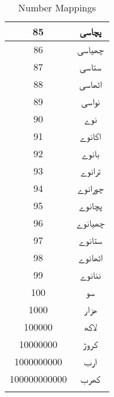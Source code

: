 \begin{longtable}[c]{|c|c|}
85              & \texturdu{پچاسی}   \\ \hline
86              & \texturdu{چھیاسی}   \\ \hline
87              & \texturdu{ستاسی}    \\ \hline
88              & \texturdu{اٹھاسی}   \\ \hline
89              & \texturdu{نواسی}    \\ \hline
90              & \texturdu{نوے}      \\ \hline
91              & \texturdu{اکانوے}   \\ \hline
92              & \texturdu{بانوے}    \\ \hline
93              & \texturdu{ترانوے}   \\ \hline
94              & \texturdu{چورانوے}  \\ \hline
95              & \texturdu{پچانوے}   \\ \hline
96              & \texturdu{چھیانوے}  \\ \hline
97              & \texturdu{ستانوے}   \\ \hline
98              & \texturdu{اٹھانوے}  \\ \hline
99              & \texturdu{ننانوے}   \\ \hline
100             & \texturdu{سو}       \\ \hline
1000            & \texturdu{ھزار}     \\ \hline
100000          & \texturdu{لاکھ  }   \\ \hline
10000000        & \texturdu{کروڑ }    \\ \hline
1000000000      & \texturdu{ارب }     \\ \hline
100000000000    & \texturdu{کھرب }    \\ \hline
\caption{Number Mappings}
\label{table:number_mapping}\\
\end{longtable} 

